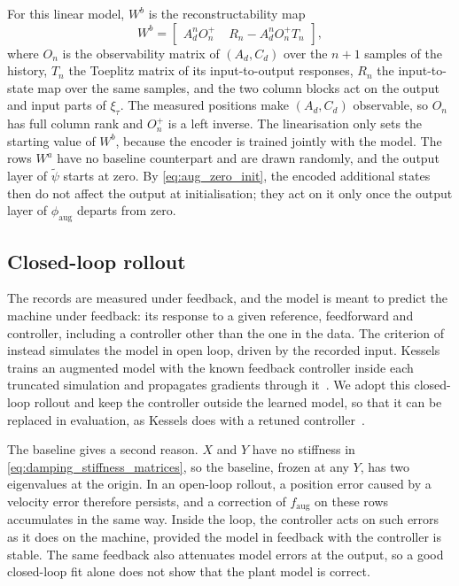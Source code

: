 For this linear model, $W^b$ is the reconstructability
map~\cite[Eqs.~(16), (17)]{hoekstra2026encoder}
\begin{equation}
 W^b=\begin{bmatrix}
  A_d^nO_n^{+} & \;R_n-A_d^nO_n^{+}T_n
 \end{bmatrix},
 \label{eq:aug_wb}
\end{equation}
where $O_n$ is the observability matrix of $(A_d,C_d)$ over the $n+1$
samples of the history, $T_n$ the Toeplitz matrix of its input-to-output
responses, $R_n$ the input-to-state map over the same samples, and the two
column blocks act on the output and input parts of $\xi_\tau$.
The measured positions make $(A_d,C_d)$ observable, so $O_n$ has full column
rank and $O_n^{+}$ is a left inverse.
The linearisation only sets the starting value of $W^b$, because the encoder
is trained jointly with the model.
The rows $W^a$ have no baseline counterpart and are drawn randomly, and the
output layer of $\tilde\psi$ starts at zero.
By \eqref{eq:aug_zero_init}, the encoded additional states then do not
affect the output at initialisation; they act on it only once the output
layer of $\phi_{\mathrm{aug}}$ departs from zero.

\subsection{Closed-loop rollout}\label{sec:aug_closed_loop}
The records are measured under feedback, and the model is meant to predict
the machine under feedback: its response to a given reference, feedforward
and controller, including a controller other than the one in the data.
The criterion of~\cite[Eq.~(22)]{hoekstra2026lfr} instead simulates the
model in open loop, driven by the recorded input.
Kessels trains an augmented model with the known feedback controller inside
each truncated simulation and propagates gradients through
it~\cite[Eqs.~(5.12), (5.13c), (5.13d)]{kessels2025ai}.
We adopt this closed-loop rollout and keep the controller outside the
learned model, so that it can be replaced in evaluation, as Kessels does
with a retuned controller~\cite[Sec.~5.3.2.3]{kessels2025ai}.

The baseline gives a second reason.
$X$ and $Y$ have no stiffness in \eqref{eq:damping_stiffness_matrices}, so
the baseline, frozen at any $Y$, has two eigenvalues at the origin.
In an open-loop rollout, a position error caused by a velocity error
therefore persists, and a correction of $f_{\mathrm{aug}}$ on these rows
accumulates in the same way.
Inside the loop, the controller acts on such errors as it does on the
machine, provided the model in feedback with the controller is stable.
The same feedback also attenuates model errors at the output, so a good
closed-loop fit alone does not show that the plant model is correct.

